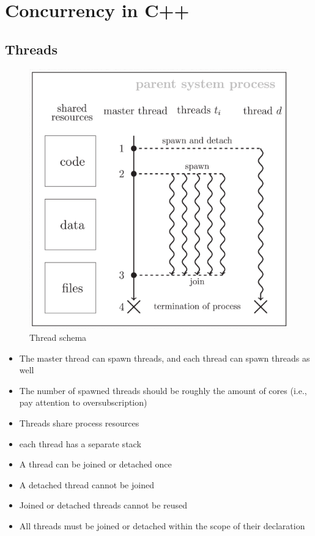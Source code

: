 \chapter{Concurrency in C++}

\section{Threads}

\begin{paracol}{2}
   \begin{figure}[htbp]
      \centering
      \includegraphics{images/08/threads1.png}
      \caption{Thread schema}
      \label{fig:08/threads1}
   
   \end{figure}
   
   \switchcolumn
   
   \begin{itemize}
      \item The master thread can spawn threads, and each thread can
   spawn threads as well
      \item The number of spawned threads should be roughly the
   amount of cores (i.e., pay attention to oversubscription)
      \item Threads share process resources
      \item each thread has a separate stack
      \item A thread can be joined or detached once
      \item A detached thread cannot be joined
      \item Joined or detached threads cannot be reused
      \item All threads must be joined or detached within the scope of
   their declaration
   \end{itemize}
\end{paracol}


